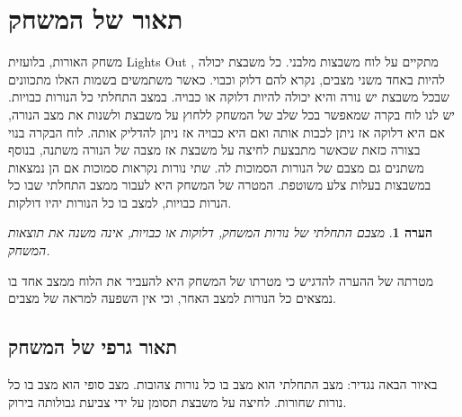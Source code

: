 \documentclass[12pt,leqno]{article}
\theoremstyle{theoremdd}
\newtheorem{comm}{הערה}[section]
\begin{document}
\section{תאור של המשחק}
משחק האורות,  בלועזית
\textenglish{Lights Out}
,
מתקיים על לוח משבצות מלבני.
כל משבצת יכולה להיות באחד משני מצבים, נקרא להם דלוק וכבוי.
כאשר משתמשים בשמות האלו מתכוונים שבכל משבצת יש נורה והיא יכולה להיות דלוקה או כבויה. במצב התחלתי כל הנורות כבויות.
יש לנו לוח בקרה שמאפשר בכל שלב של המשחק ללחוץ על משבצת ולשנות את מצב הנורה, אם היא דלוקה אז ניתן לכבות אותה ואם היא כבויה אז ניתן להדליק אותה.
לוח הבקרה בנוי בצורה כזאת שכאשר מתבצעת לחיצה על משבצת אז מצבה של הנורה משתנה, בנוסף משתנים גם מצבם של הנורות הסמוכות לה.
שתי נורות נקראות סמוכות אם הן נמצאות במשבצות בעלות צלע משוטפת.
המטרה של המשחק היא לעבור ממצב התחלתי שבו כל הנרות כבויות, למצב בו כל הנורות יהיו דולקות. 
\begin{comm}
מצבם התחלתי של נורות המשחק, דלוקות או כבויות, אינה משנה את תוצאות המשחק.
\end{comm}
מטרתה של ההערה להדגיש כי
מטרתו של המשחק היא להעביר
 את הלוח ממצב אחד בו נמצאים כל הנורות למצב האחר,
 וכי אין השפעה למראה של מצבים.
 
\subsection{תאור גרפי של המשחק}
באיור הבאה נגדיר:
מצב התחלתי הוא מצב בו כל נורות
צהובות.
מצב סופי הוא מצב בו כל נורות שחורות.
לחיצה על משבצת תסומן על ידי צביעת גבולותה בירוק.
\end{document}
